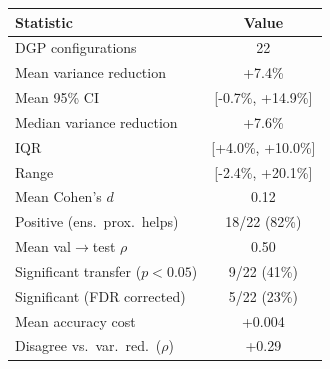 \begin{tabular}{lc}
\toprule
Statistic & Value \\
\midrule
DGP configurations & 22 \\
Mean variance reduction & +7.4\% \\
Mean 95\% CI & [-0.7\%, +14.9\%] \\
Median variance reduction & +7.6\% \\
IQR & [+4.0\%, +10.0\%] \\
Range & [-2.4\%, +20.1\%] \\
Mean Cohen's $d$ & 0.12 \\
Positive (ens.\ prox.\ helps) & 18/22 (82\%) \\
Mean val$\to$test $\rho$ & 0.50 \\
Significant transfer ($p<0.05$) & 9/22 (41\%) \\
Significant (FDR corrected) & 5/22 (23\%) \\
Mean accuracy cost & +0.004 \\
Disagree vs.\ var.\ red.\ ($\rho$) & +0.29 \\
\bottomrule
\end{tabular}